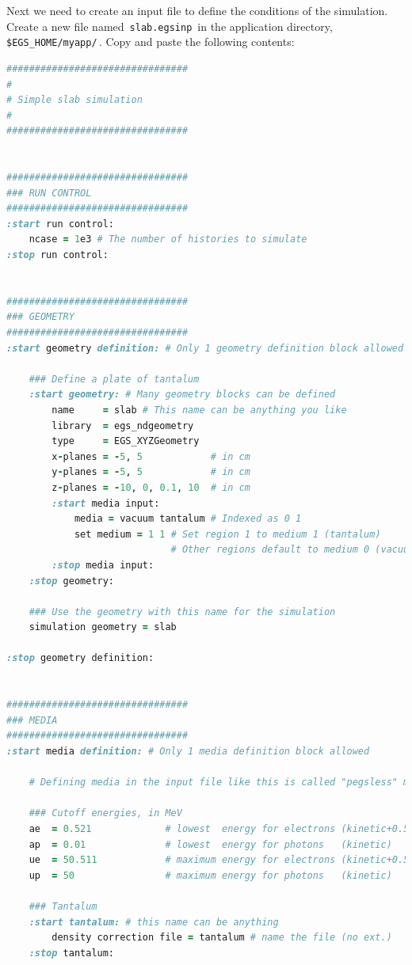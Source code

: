 \documentclass[12pt,twoside]{article}
\begin{document}
Next we need to create an input file to define the conditions of the simulation.
Create a new file named \,\Verb|slab.egsinp|\, in the application directory,
\,\Verb|$EGS_HOME/myapp/|\,. Copy and paste the following contents:

\begin{lstlisting}[language=ruby,backgroundcolor=\color{white}]
################################
#
# Simple slab simulation
#
################################


################################
### RUN CONTROL
################################
:start run control:
    ncase = 1e3 # The number of histories to simulate
:stop run control:


################################
### GEOMETRY
################################
:start geometry definition: # Only 1 geometry definition block allowed

    ### Define a plate of tantalum
    :start geometry: # Many geometry blocks can be defined
        name     = slab # This name can be anything you like
        library  = egs_ndgeometry
        type     = EGS_XYZGeometry
        x-planes = -5, 5            # in cm
        y-planes = -5, 5            # in cm
        z-planes = -10, 0, 0.1, 10  # in cm
        :start media input:
            media = vacuum tantalum # Indexed as 0 1
            set medium = 1 1 # Set region 1 to medium 1 (tantalum)
                             # Other regions default to medium 0 (vacuum)
        :stop media input:
    :stop geometry:

    ### Use the geometry with this name for the simulation
    simulation geometry = slab

:stop geometry definition:


################################
### MEDIA
################################
:start media definition: # Only 1 media definition block allowed

    # Defining media in the input file like this is called "pegsless" mode

    ### Cutoff energies, in MeV
    ae  = 0.521             # lowest  energy for electrons (kinetic+0.511)
    ap  = 0.01              # lowest  energy for photons   (kinetic)
    ue  = 50.511            # maximum energy for electrons (kinetic+0.511)
    up  = 50                # maximum energy for photons   (kinetic)

    ### Tantalum
    :start tantalum: # this name can be anything
        density correction file = tantalum # name the file (no ext.)
    :stop tantalum:


\end{lstlisting}
\end{document}
